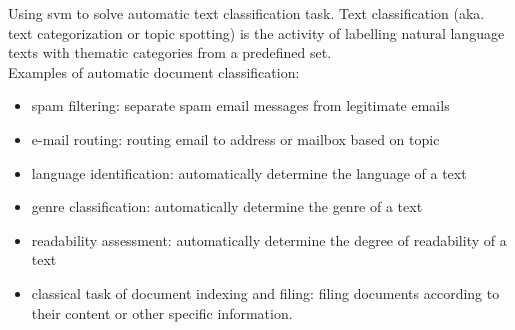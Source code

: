 Using \gls{svm} to solve automatic text classification task.
Text classification (aka. text categorization or topic spotting) is the activity of labelling natural language texts with thematic categories from a predefined set. \\
Examples of automatic document classification:
\begin{itemize}
	\item spam filtering: separate spam email messages from legitimate emails
	\item e-mail routing: routing email to address or mailbox based on topic
	\item language identification: automatically determine the language of a text
	\item genre classification: automatically determine the genre of a text
	\item readability assessment: automatically determine the degree of readability of a text 
	\item classical task of document indexing and filing: filing documents according to their content or other specific information.
\end{itemize}

